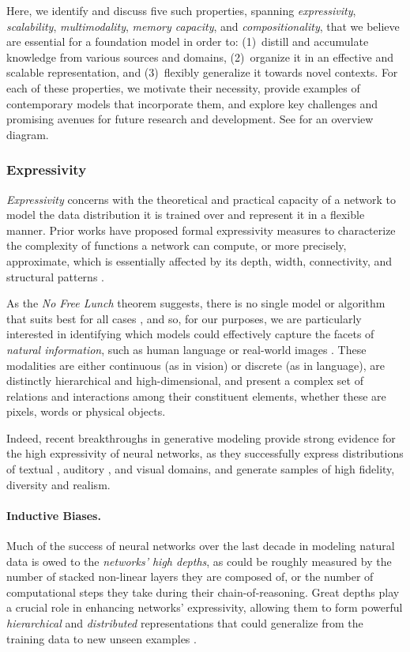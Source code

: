 Here, we identify and discuss five such properties, spanning \textit{expressivity}, \textit{scalability}, \textit{multimodality}, \textit{memory capacity}, and \textit{compositionality}, that we believe are essential for a foundation model in order to: (1)~distill and accumulate knowledge from various sources and domains, (2)~organize it in an effective and scalable representation, and (3)~flexibly generalize it towards novel contexts.  For each of these properties, we motivate their necessity, provide examples of contemporary  models that incorporate them, and explore key challenges and promising avenues  for future research and development. See  for an overview diagram.

\subsubsection{Expressivity} 
\label{sec:modeling-expressivity} 

\textit{Expressivity} concerns with the theoretical and practical capacity of a network to model the data distribution it is trained over and represent it in a flexible manner. Prior works have proposed formal expressivity measures to characterize the complexity of functions a network can compute, or more precisely, approximate, which is essentially affected by its depth, width, connectivity, and structural patterns \citep{expressive}.

As the \textit{No Free Lunch} theorem suggests, there is no single model or algorithm that suits best for all cases \citep{lunch}, and so, for our purposes, we are particularly interested in identifying which models could effectively capture the facets of \textit{natural information}, such as human language or real-world images \citep{bengiobook}. These modalities are either continuous (as in vision) or discrete (as in language),  are distinctly hierarchical and high-dimensional, and present a complex set of relations and interactions among their constituent elements, whether these are  pixels, words or physical objects. 

Indeed, recent breakthroughs in generative modeling provide strong evidence for the high expressivity of neural networks, as they successfully express distributions of textual \citep{brown2020gpt3,devlin2019bert,jurassic1,gpt-j}, auditory \citep{Oord2016WaveNetAG}, and visual \citep{stylegan2,biggan} domains, and generate samples of high fidelity, diversity and realism.

\paragraph{Inductive Biases.} Much of the success of neural networks over the last decade in modeling natural data is owed to the \textit{networks' high depths}, as could be roughly measured by the number of stacked non-linear layers they are composed of, or the number of computational steps they take during their chain-of-reasoning.  Great depths play a crucial role in enhancing networks' expressivity, allowing them to form powerful \textit{hierarchical} and \textit{distributed} representations that could generalize from the training data to new unseen examples \citep{he2016resnet,levine2020limits}. 

